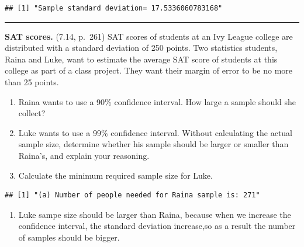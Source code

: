 \documentclass[]{article}
\newenvironment{Shaded}{\begin{snugshade}}{\end{snugshade}}
\newcommand{\CommentTok}[1]{\textcolor[rgb]{0.56,0.35,0.01}{\textit{#1}}}
\newcommand{\DataTypeTok}[1]{\textcolor[rgb]{0.13,0.29,0.53}{#1}}
\newcommand{\DecValTok}[1]{\textcolor[rgb]{0.00,0.00,0.81}{#1}}
\newcommand{\FloatTok}[1]{\textcolor[rgb]{0.00,0.00,0.81}{#1}}
\newcommand{\KeywordTok}[1]{\textcolor[rgb]{0.13,0.29,0.53}{\textbf{#1}}}
\newcommand{\NormalTok}[1]{#1}
\newcommand{\OperatorTok}[1]{\textcolor[rgb]{0.81,0.36,0.00}{\textbf{#1}}}
\newcommand{\StringTok}[1]{\textcolor[rgb]{0.31,0.60,0.02}{#1}}
\providecommand{\tightlist}{%
  \setlength{\itemsep}{0pt}\setlength{\parskip}{0pt}}
\begin{document}
\begin{verbatim}
## [1] "Sample standard deviation= 17.5336060783168"
\end{verbatim}

\begin{center}\rule{0.5\linewidth}{\linethickness}\end{center}

\clearpage

\textbf{SAT scores.} (7.14, p.~261) SAT scores of students at an Ivy
League college are distributed with a standard deviation of 250 points.
Two statistics students, Raina and Luke, want to estimate the average
SAT score of students at this college as part of a class project. They
want their margin of error to be no more than 25 points.

\begin{enumerate}
\def\labelenumi{(\alph{enumi})}
\tightlist
\item
  Raina wants to use a 90\% confidence interval. How large a sample
  should she collect?
\item
  Luke wants to use a 99\% confidence interval. Without calculating the
  actual sample size, determine whether his sample should be larger or
  smaller than Raina's, and explain your reasoning.
\item
  Calculate the minimum required sample size for Luke.
\end{enumerate}

\begin{Shaded}
\end{Shaded}

\begin{verbatim}
## [1] "(a) Number of people needed for Raina sample is: 271"
\end{verbatim}

\begin{enumerate}
\def\labelenumi{(\alph{enumi})}
\setcounter{enumi}{1}
\tightlist
\item
  Luke sampe size should be larger than Raina, because when we increase
  the confidence interval, the standard deviation increase,so as a
  result the number of samples should be bigger.
\end{enumerate}
\end{document}
